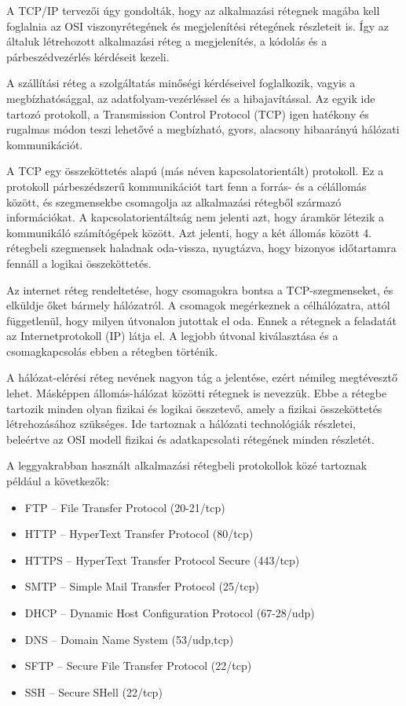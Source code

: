 A TCP/IP tervezői úgy gondolták, hogy az alkalmazási rétegnek magába kell foglalnia az OSI viszonyrétegének és megjelenítési rétegének részleteit is. Így az általuk létrehozott alkalmazási réteg a megjelenítés, a kódolás és a párbeszédvezérlés kérdéseit kezeli. 

A szállítási réteg a szolgáltatás minőségi kérdéseivel foglalkozik, vagyis a megbízhatósággal, az adatfolyam-vezérléssel és a hibajavítással. Az egyik ide tartozó protokoll, a Transmission Control Protocol (TCP) igen hatékony és rugalmas módon teszi lehetővé a megbízható, gyors, alacsony hibaarányú hálózati kommunikációt. 

A TCP egy összeköttetés alapú (más néven kapcsolatorientált) protokoll. Ez a protokoll párbeszédszerű kommunikációt tart fenn a forrás- és a célállomás között, és szegmensekbe csomagolja az alkalmazási rétegből származó információkat. A kapcsolatorientáltság nem jelenti azt, hogy áramkör létezik a kommunikáló számítógépek között. Azt jelenti, hogy a két állomás között 4. rétegbeli szegmensek haladnak oda-vissza, nyugtázva, hogy bizonyos időtartamra fennáll a logikai összeköttetés.

Az internet réteg rendeltetése, hogy csomagokra bontsa a TCP-szegmenseket, és elküldje őket bármely hálózatról. A csomagok megérkeznek a célhálózatra, attól függetlenül, hogy milyen útvonalon jutottak el oda. Ennek a rétegnek a feladatát az Internetprotokoll (IP) látja el. A legjobb útvonal kiválasztása és a csomagkapcsolás ebben a rétegben történik.

A hálózat-elérési réteg nevének nagyon tág a jelentése, ezért némileg megtévesztő lehet. Másképpen állomás-hálózat közötti rétegnek is nevezzük. Ebbe a rétegbe tartozik minden olyan fizikai és logikai összetevő, amely a fizikai összeköttetés létrehozásához szükséges. Ide tartoznak a hálózati technológiák részletei, beleértve az OSI modell fizikai és adatkapcsolati rétegének minden részletét.

A leggyakrabban használt alkalmazási rétegbeli protokollok közé tartoznak például a következők: 
\begin{itemize}[nosep]
	\item FTP -- File Transfer Protocol (20-21/tcp)
	\item HTTP -- HyperText Transfer Protocol (80/tcp)
	\item HTTPS -- HyperText Transfer Protocol Secure (443/tcp)
	\item SMTP -- Simple Mail Transfer Protocol (25/tcp)
	\item DHCP -- Dynamic Host Configuration Protocol (67-28/udp)
	\item DNS -- Domain Name System (53/udp,tcp)
	\item SFTP -- Secure File Transfer Protocol (22/tcp)
	\item SSH -- Secure SHell (22/tcp)
\end{itemize}

